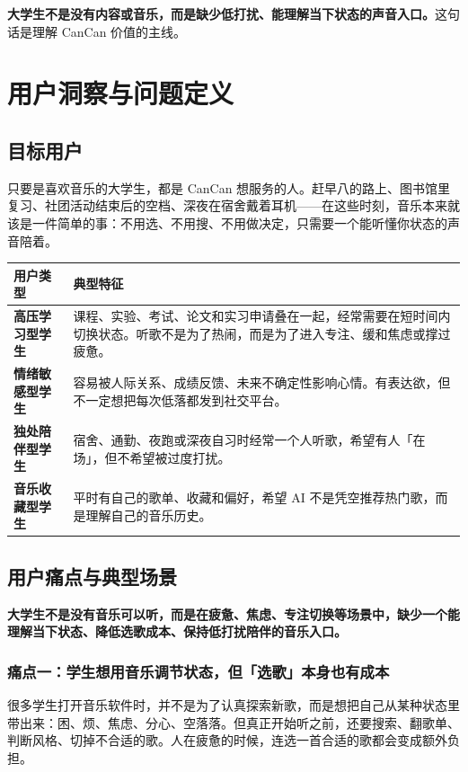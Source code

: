 \documentclass[UTF8,a4paper,11pt,fontset=windows]{ctexart}
\begin{document}
\textbf{大学生不是没有内容或音乐，而是缺少低打扰、能理解当下状态的声音入口。}这句话是理解 CanCan 价值的主线。

\section{用户洞察与问题定义}

\subsection{目标用户}

只要是喜欢音乐的大学生，都是 CanCan 想服务的人。赶早八的路上、图书馆里复习、社团活动结束后的空档、深夜在宿舍戴着耳机——在这些时刻，音乐本来就该是一件简单的事：不用选、不用搜、不用做决定，只需要一个能听懂你状态的声音陪着。

\begin{longtable}{>{\bfseries}p{3.2cm}p{11.4cm}}
\toprule
用户类型 & 典型特征 \\
\midrule
高压学习型学生 & 课程、实验、考试、论文和实习申请叠在一起，经常需要在短时间内切换状态。听歌不是为了热闹，而是为了进入专注、缓和焦虑或撑过疲惫。 \\
情绪敏感型学生 & 容易被人际关系、成绩反馈、未来不确定性影响心情。有表达欲，但不一定想把每次低落都发到社交平台。 \\
独处陪伴型学生 & 宿舍、通勤、夜跑或深夜自习时经常一个人听歌，希望有人「在场」，但不希望被过度打扰。 \\
音乐收藏型学生 & 平时有自己的歌单、收藏和偏好，希望 AI 不是凭空推荐热门歌，而是理解自己的音乐历史。 \\
\bottomrule
\end{longtable}

\subsection{用户痛点与典型场景}

\textbf{大学生不是没有音乐可以听，而是在疲惫、焦虑、专注切换等场景中，缺少一个能理解当下状态、降低选歌成本、保持低打扰陪伴的音乐入口。}

\subsubsection{痛点一：学生想用音乐调节状态，但「选歌」本身也有成本}

很多学生打开音乐软件时，并不是为了认真探索新歌，而是想把自己从某种状态里带出来：困、烦、焦虑、分心、空落落。但真正开始听之前，还要搜索、翻歌单、判断风格、切掉不合适的歌。人在疲惫的时候，连选一首合适的歌都会变成额外负担。
\end{document}
